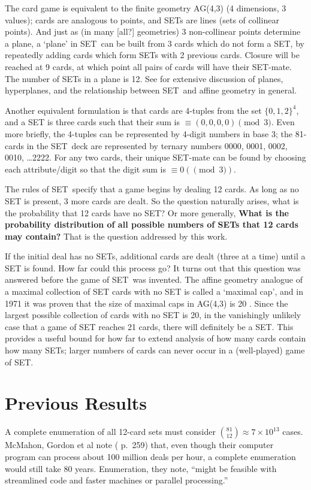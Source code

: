 \documentclass[10pt]{amsart}
\newcommand{\SETb}{SET\texttrademark\ } %
\newcommand{\SET}{SET\texttrademark}  %
\begin{document}
The card game is equivalent to the finite geometry AG(4,3) (4 dimensions, 3
values); cards are analogous to points, and SETs are lines (sets of collinear
points). And just as (in many [all?] geometries) 3 non-collinear points
determine a plane, a `plane' in \SETb can be built from 3 cards which do not
form a SET, by repeatedly adding cards which form SETs with 2 previous
cards. Closure will be reached at 9 cards, at which point all pairs of cards
will have their SET-mate. The number of SETs in a plane is 12. See \cite{JOS}
for extensive discussion of planes, hyperplanes, and the relationship between
\SETb and affine geometry in general.

Another equivalent formulation is that cards are 4-tuples from the set
$\{0,1,2\}^4$, and a SET is three cards such that their sum is $\equiv (0,0,0,0)
\pmod 3$. Even more briefly, the 4-tuples can be represented by 4-digit numbers
in base 3; the 81-cards in the \SETb deck are represented by ternary numbers
0000, 0001, 0002, 0010, \ldots 2222. For any two cards, their unique SET-mate
can be found by choosing each attribute/digit so that the digit sum is $\equiv 0
(\pmod 3)$.

The rules of \SETb specify that a game begins by dealing 12 cards. As long as no
SET is present, 3 more cards are dealt. So the question naturally arises, what
is the probability that 12 cards have no SET? Or more generally, {\bf What is
  the probability distribution of all possible numbers of SETs that 12 cards may
  contain?} That is the question addressed by this work.

If the initial deal has no SETs, additional cards are dealt (three at a time)
until a SET is found. How far could this process go? It turns out that this
question was answered before the game of \SETb was invented. The affine geometry
analogue of a maximal collection of SET cards with no SET is called a `maximal
cap', and in 1971 it was proven that the size of maximal caps in AG(4,3) is 20
\cite{MAXCAP}. Since the largest possible collection of cards with no SET is 20,
in the vanishingly unlikely case that a game of SET reaches 21 cards, there will
definitely be a SET.  This provides a useful bound for how far to extend
analysis of how many cards contain how many SETs; larger numbers of cards can
never occur in a (well-played) game of \SET.

\section{Previous Results}
A complete enumeration of all 12-card sets must consider $\binom{81}{12} \approx
7\times 10^{13}$ cases. McMahon, Gordon et al note (\cite{JOS} p.~259) that,
even though their computer program can process about 100 million deals per hour,
a complete enumeration would still take 80 years. Enumeration, they note,
``might be feasible with streamlined code and faster machines or parallel
processing.''
\end{document}
